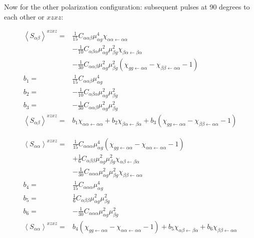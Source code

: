 Now for the other polarization configuration: subsequent pulses at 90 degrees to each other or $xzxz$:

\begin{align*}
	\left \langle S_{\alpha \beta} \right \rangle^{xzxz} =&  \frac{1}{15}C_{\alpha \alpha \beta} \mu_{\alpha g}^4 \chi_{\alpha \alpha \leftarrow \alpha \alpha} \\
	&- \frac{1}{10}C_{\alpha \beta \alpha} \mu_{\alpha g}^2 \mu_{\beta g}^2 \chi_{\beta \alpha \leftarrow \beta \alpha} \\
	&- \frac{1}{30}C_{\alpha \alpha \beta} \mu_{\alpha g}^2 \mu_{\beta g}^2 \left(  \chi_{g g \leftarrow \alpha \alpha}  -  \chi_{\beta \beta \leftarrow \alpha \alpha} -1 \right) \\
	b_1 =&  \frac{1}{15}C_{\alpha \alpha \beta} \mu_{\alpha g}^4 \\
	b_2 =&  -\frac{1}{10}C_{\alpha \beta \alpha} \mu_{\alpha g}^2 \mu_{\beta g}^2 \\
	b_3 =&  -\frac{1}{30}C_{\alpha \alpha \beta} \mu_{\alpha g}^2 \mu_{\beta g}^2 \\
	\left \langle S_{\alpha \beta} \right \rangle^{xzxz} =&  b_1  \chi_{\alpha \alpha \leftarrow \alpha \alpha} + b_2 \chi_{\beta \alpha \leftarrow \beta \alpha} + b_3 \left(  \chi_{g g \leftarrow \alpha \alpha}  -  \chi_{\beta \beta \leftarrow \alpha \alpha} -1 \right)
\end{align*}


\begin{align*}
	\left \langle S_{\alpha \alpha} \right \rangle^{xzxz} =&  \frac{1}{15}C_{\alpha \alpha \alpha} \mu_{\alpha g}^4  \left(  \chi_{g g \leftarrow \alpha \alpha}  -  \chi_{ \alpha \alpha \leftarrow \alpha \alpha} -1 \right) \\
	&+ \frac{1}{6}C_{ \alpha \beta \beta} \mu_{\alpha g}^2 \mu_{\beta g}^2 \chi_{\alpha \beta \leftarrow \beta \alpha} \\
	&-\frac{1}{30}C_{\alpha \alpha \alpha} \mu_{\alpha g}^2 \mu_{\beta g}^2 \chi_{\beta \beta \leftarrow \alpha \alpha} \\
	b_4 =&  \frac{1}{15}C_{\alpha \alpha \alpha} \mu_{\alpha g}^4 \\
	b_5 =&  \frac{1}{6}C_{ \alpha \beta \beta} \mu_{\alpha g}^2 \mu_{\beta g}^2  \\
	b_6 =&  -\frac{1}{30}C_{\alpha \alpha \alpha} \mu_{\alpha g}^2 \mu_{\beta g}^2 \\
	\left \langle S_{\alpha \alpha} \right \rangle^{xzxz} =&   b_4 \left(  \chi_{g g \leftarrow \alpha \alpha}  -  \chi_{ \alpha \alpha \leftarrow \alpha \alpha} -1 \right) + b_5 \chi_{\alpha \beta \leftarrow \beta \alpha} + b_6 \chi_{\beta \beta \leftarrow \alpha \alpha}
\end{align*}


